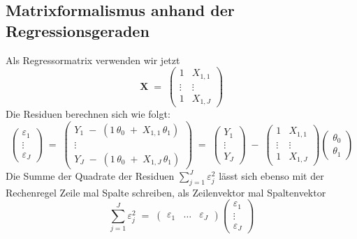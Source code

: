 \subsection{Matrixformalismus anhand der Regressionsgeraden}
Als Regressormatrix verwenden wir jetzt
\begin{equation}
\mathbf{X} \; = \;
\left(
\begin{array}{cc}
1 &  X_{1,1} \\
\vdots & \vdots\\
1 & X_{1,J}
\end{array}
\right)
\end{equation}
Die Residuen berechnen sich wie folgt:
\begin{equation}
\left(
\begin{array}{c}
\varepsilon_1\\
\vdots \\
\varepsilon_J
\end{array}
\right)  \; = \;
\left(
\begin{array}{c}
Y_{1} \; - \; (1 \, \theta_0 \; + \;  X_{1,1} \, \theta_1)\\
\vdots \\
Y_{J} \; - \; (1 \, \theta_0 \; + \;  X_{1,J} \, \theta_1)
\end{array}
\right) \; = \;
\left(
\begin{array}{c}
Y_{1}\\
\vdots \\
Y_{J}
\end{array}
\right)
\; - \;
\left(
\begin{array}{cc}
1 &  X_{1,1} \\
\vdots & \vdots\\
1 & X_{1,J}
\end{array}
\right)
\left(
\begin{array}{c}
\theta_0\\
\theta_1
\end{array}
\right)
\label{linearRegressionGeradeTheta}
\end{equation}
Die Summe der Quadrate der Residuen $\sum_{j=1}^J \varepsilon_j^2$ lässt sich ebenso
mit der Rechenregel Zeile mal Spalte schreiben, als Zeilenvektor mal Spaltenvektor
\begin{equation}
\sum_{j=1}^J \varepsilon_j^2 \; = \;
\left(\begin{array}{ccc}
\varepsilon_1 & \dots & \varepsilon_J
\end{array}
\right)
\left(
\begin{array}{c}
\varepsilon_1\\
\vdots \\
\varepsilon_J
\end{array}
\right)
\end{equation}
